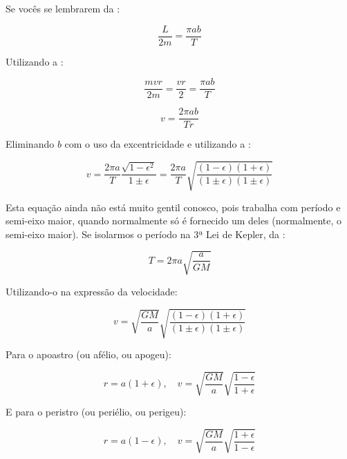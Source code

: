 Se vocês se lembrarem da :

\[
	\frac{L}{2m} = \frac{\pi ab}{T}
\]

Utilizando a :

\[
	\frac{mvr}{2m} = \frac{vr}{2} = \frac{\pi ab}{T}
\]

\[
	v = \frac{2\pi ab}{Tr}
\]

Eliminando $b$ com o uso da excentricidade e utilizando a :

\[
	v = \frac{2\pi a}{T} \frac{\sqrt{1 - \epsilon^2}}{1 \pm \epsilon}
	  = \frac{2\pi a}{T} \sqrt{\frac{(1-\epsilon)(1+\epsilon)}{(1 \pm \epsilon)(1 \pm \epsilon)}}
\]

Esta equação ainda não está muito gentil conosco, pois trabalha com período e semi-eixo maior, quando normalmente só é fornecido um deles (normalmente, o semi-eixo maior). Se isolarmos o período na 3ª Lei de Kepler, da :

\begin{equation}
	T = 2\pi a \sqrt{\frac{a}{GM}}	\label{eq70}
\end{equation}

Utilizando-o na expressão da velocidade:

\[
	v = \sqrt{\frac{GM}{a}} \sqrt{\frac{(1-\epsilon)(1+\epsilon)}{(1 \pm \epsilon)(1 \pm \epsilon)}}
\]

Para o apoastro (ou afélio, ou apogeu):

\begin{equation}
	r = a (1 + \epsilon), \quad
	v = \sqrt{\frac{GM}{a}} \sqrt{\frac{1-\epsilon}{1+\epsilon}}	
	\label{eq71}
\end{equation}

E para o peristro (ou periélio, ou perigeu):

\begin{equation}
	r = a (1 - \epsilon), \quad
	v = \sqrt{\frac{GM}{a}} \sqrt{\frac{1+\epsilon}{1-\epsilon}}	
	\label{eq72}
\end{equation}

